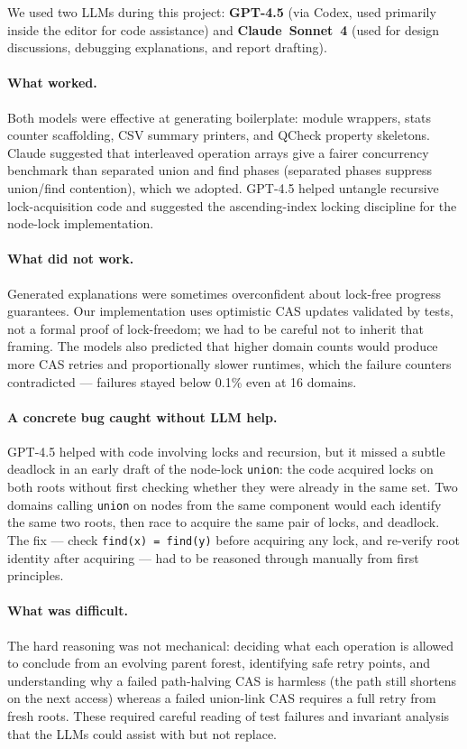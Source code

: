 \documentclass[11pt,a4paper]{article}
\begin{document}
We used two LLMs during this project: \textbf{GPT-4.5} (via Codex, used
primarily inside the editor for code assistance) and \textbf{Claude~Sonnet~4}
(used for design discussions, debugging explanations, and report drafting).

\paragraph{What worked.}
Both models were effective at generating boilerplate: module wrappers, stats
counter scaffolding, CSV summary printers, and QCheck property skeletons.
Claude suggested that interleaved operation arrays give a fairer concurrency
benchmark than separated union and find phases (separated phases suppress
union/find contention), which we adopted.  GPT-4.5 helped untangle recursive
lock-acquisition code and suggested the ascending-index locking discipline for
the node-lock implementation.

\paragraph{What did not work.}
Generated explanations were sometimes overconfident about lock-free progress
guarantees.  Our implementation uses optimistic CAS updates validated by tests,
not a formal proof of lock-freedom; we had to be careful not to inherit that
framing.  The models also predicted that higher domain counts would produce
more CAS retries and proportionally slower runtimes, which the failure counters
contradicted --- failures stayed below 0.1\% even at 16 domains.

\paragraph{A concrete bug caught without LLM help.}
GPT-4.5 helped with code involving locks and recursion, but it missed a subtle
deadlock in an early draft of the node-lock \texttt{union}: the code acquired
locks on both roots without first checking whether they were already in the same
set.  Two domains calling \texttt{union} on nodes from the same component would
each identify the same two roots, then race to acquire the same pair of locks,
and deadlock.  The fix --- check \texttt{find(x) = find(y)} before acquiring
any lock, and re-verify root identity after acquiring --- had to be reasoned
through manually from first principles.

\paragraph{What was difficult.}
The hard reasoning was not mechanical: deciding what each operation is allowed
to conclude from an evolving parent forest, identifying safe retry points, and
understanding why a failed path-halving CAS is harmless (the path still shortens
on the next access) whereas a failed union-link CAS requires a full retry from
fresh roots.  These required careful reading of test failures and invariant
analysis that the LLMs could assist with but not replace.
\end{document}
